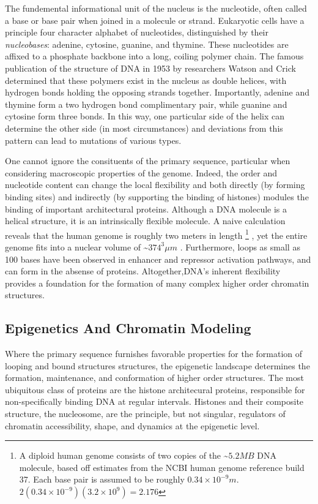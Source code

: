 \documentclass[phd,tocprelim]{cornell}
\begin{document}
The fundemental informational unit of the nucleus is the nucleotide, often
called a base or base pair when joined in a molecule or strand.  Eukaryotic
cells have a principle four character alphabet of nucleotides, distinguished
by their \textit{nucleobases}: adenine, cytosine, guanine, and thymine.  These
nucleotides are affixed to a phosphate backbone into a long, coiling polymer
chain.  The famous publication of the structure of DNA in 1953 by researchers
Watson and Crick determined that these polymers exist in the nucleus as double
helices\cite{watson1953}, with hydrogen bonds holding the opposing strands
together.  Importantly, adenine and thymine form a two hydrogen bond
complimentary pair, while guanine and cytosine form three bonds.  In this way,
one particular side of the helix can determine the other side (in most circumstances)
and deviations from this pattern can lead to mutations of various types\cite{cox2012}.

One cannot ignore the consituents of the primary sequence, particular when
considering macroscopic properties of the genome.  Indeed, the order and
nucleotide content can change the local flexibility and both directly (by
forming binding sites) and indirectly (by supporting the binding of histones)
modules the binding of important architectural proteins\cite{travers2004}.
Although a DNA molecule is a helical structure, it is an intrinsically
flexible molecule.  A naive calculation reveals that the human genome is
roughly two meters in length%
\footnote{%
  A diploid human genome consists of two copies of the \~{}$5.2MB$ DNA molecule,
  based off estimates from the NCBI human genome reference build 37.
  Each base pair is assumed to be roughly $0.34\times10^{-9}m$.
  $2(0.34 \times 10^{-9})(3.2 \times 10^9) = 2.176$
}
, yet the entire genome fits into a nuclear volume of \~{}$374^3\mu{}m$
\cite{marks2011}.  Furthermore, loops as small as 100 bases have been
observed in enhancer and repressor activation pathways\cite{wong2008}, and
can form in the absense of proteins\cite{vafabakhsh2012}.  Altogether,DNA's
inherent flexibility provides a foundation for the formation of many complex
higher order chromatin structures.

\subsection{Epigenetics And Chromatin Modeling}

Where the primary sequence furnishes favorable properties for the formation of
looping and bound structures structures, the epigenetic landscape determines
the formation, maintenance, and conformation of higher order structures.  The
most ubiquitous class of proteins are the histone architecural proteins,
responsible for non-specifically binding DNA at regular intervals.  Histones
and their composite structure, the nucleosome, are the principle, but not singular,
regulators of chromatin accessibility, shape, and dynamics at the epigenetic
level.
\end{document}
